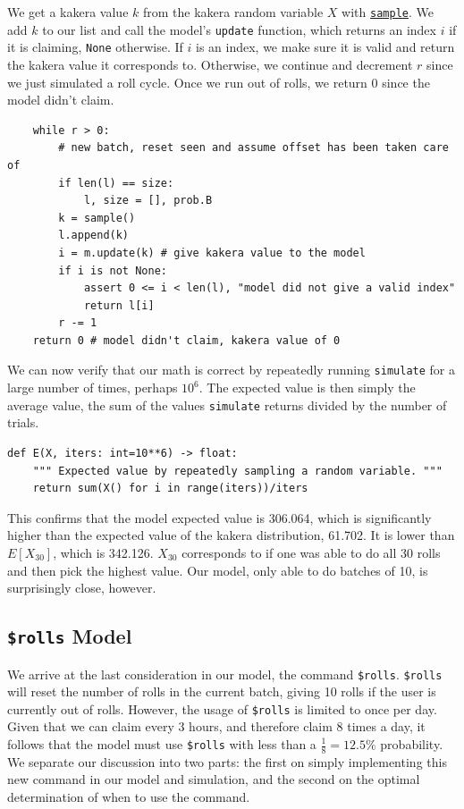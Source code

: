 \documentclass[11pt, oneside]{article}
\theoremstyle{plain}
\theoremstyle{definition}
\begin{document}
We get a kakera value \( k \) from the kakera random variable \( X \) with
\hyperref[alg:sample]{\texttt{sample}}. We add \( k \) to our list and call
the model's \texttt{update} function, which returns an index \( i \) if it is
claiming, \texttt{None} otherwise. If \( i \) is an index, we make
sure it is valid and return the kakera value it corresponds to. Otherwise, we
continue and decrement \( r \) since we just simulated a roll cycle. Once we
run out of rolls, we return 0 since the model didn't claim.
\begin{verbatim}
    while r > 0:
        # new batch, reset seen and assume offset has been taken care of
        if len(l) == size:
            l, size = [], prob.B
        k = sample()
        l.append(k)
        i = m.update(k) # give kakera value to the model 
        if i is not None:
            assert 0 <= i < len(l), "model did not give a valid index"
            return l[i]
        r -= 1
    return 0 # model didn't claim, kakera value of 0
\end{verbatim}

We can now verify that our math is correct by repeatedly running
\texttt{simulate} for a large number of times, perhaps \( 10^6 \).
The expected value is then simply the average value, the sum of the
values \texttt{simulate} returns divided by the number of trials.
\begin{verbatim}
def E(X, iters: int=10**6) -> float:
    """ Expected value by repeatedly sampling a random variable. """
    return sum(X() for i in range(iters))/iters
\end{verbatim}

This confirms that the model expected value is 306.064, which is significantly
higher than the expected value of the kakera distribution, 61.702. It is lower
than \( E[X_{30}] \), which is 342.126. \( X_{30} \) corresponds to if one was
able to do all 30 rolls and then pick the highest value. Our model, only able
to do batches of 10, is surprisingly close, however.

\subsection{\texttt{\$rolls} Model} \label{subsec:rolls}
We arrive at the last consideration in our model, the command \texttt{\$rolls}.
\texttt{\$rolls} will reset the number of rolls in the current batch, giving
10 rolls if the user is currently out of rolls. However, the usage of
\texttt{\$rolls} is limited to once per day. Given that we can claim every
3 hours, and therefore claim 8 times a day, it follows that the model must
use \texttt{\$rolls} with less than a \( \frac{1}{8} = 12.5\%\) probability.
We separate our discussion into two parts: the first on simply implementing
this new command in our model and simulation, and the second on the optimal
determination of when to use the command.
\end{document}
